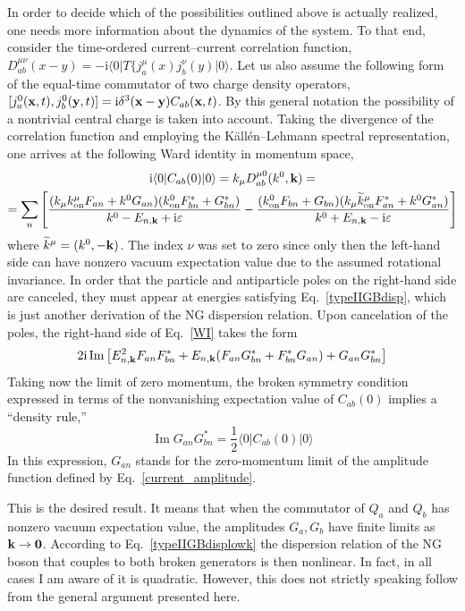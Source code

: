 \documentclass[final,2p,times,12pt,sort&compress]{elsarticle}
\newcommand\vek[1]{{\boldsymbol{\bf #1}}}   %
\newcommand\bra[1]{\langle#1\vert}          %
\newcommand\ket[1]{\vert#1\rangle}          %
\newcommand\imag{\mathrm i}                 %
\newcommand\ve{\varepsilon}
\DeclareMathOperator{\im}{Im}               %
\begin{document}
In order to decide which of the possibilities outlined above is actually
realized, one needs more information about the dynamics of the system. To that
end, consider the time-ordered current--current correlation function,
$D^{\mu\nu}_{ab}(x-y)=-\imag\bra0T\{j^\mu_a(x)j^\nu_b(y)\ket0$. Let us also
assume the following form of the equal-time commutator of two charge density
operators, $[j_a^0(\vek x,t),j_b^0(\vek y,t)]=\imag\delta^3(\vek x-\vek
y)C_{ab}(\vek x,t)$. By this general notation the possibility of a nontrivial
central charge is taken into account. Taking the divergence of the correlation
function and employing the K\"all\'en--Lehmann spectral representation, one
arrives at the following Ward identity in momentum space,
\begin{multline}
\imag\bra0C_{ab}(0)\ket0=k_{\mu}D^{\mu0}_{ab}(k^0,\vek k)=\\
=\sum_n\left[\frac{(k_{\mu}k_{\text{on}}^{\mu}F_{an}+k^0G_{an})
(k_{\text{on}}^0F^*_{bn}+G^*_{bn})}
{k^0-E_{n,\vek k}+\imag\ve}
-\frac{(k_{\text{on}}^0F_{bn}+G_{bn})
(k_{\mu}\widetilde k_{\text{on}}^{\mu}F^*_{an}+k^0G^*_{an})}
{k^0+E_{n,\vek k}-\imag\ve}\right]
\label{WI}
\end{multline}
where $\widetilde k^\mu=(k^0,-\vek k)$. The index $\nu$ was set to zero since
only then the left-hand side can have nonzero vacuum expectation value due to
the assumed rotational invariance. In order that the particle and antiparticle
poles on the right-hand side are canceled, they must appear at energies
satisfying Eq.~\eqref{typeIIGBdisp}, which is just another derivation of the NG
dispersion relation. Upon cancelation of the poles, the right-hand side of
Eq.~\eqref{WI} takes the form
\begin{equation}
2\imag\im\left[E_{n,\vek k}^2F_{an}F^*_{bn}+E_{n,\vek
k}(F_{an}G^*_{bn}+F^*_{bn}G_{an})+G_{an}G^*_{bn}\right]
\end{equation}
Taking now the limit of zero momentum, the broken symmetry condition expressed
in terms of the nonvanishing expectation value of $C_{ab}(0)$ implies a
``density rule,''
\begin{equation}
\im G_{an}G^*_{bn}=\frac12\bra0C_{ab}(0)\ket0
\label{density_rule}
\end{equation}
In this expression, $G_{an}$ stands for the zero-momentum limit of the
amplitude function defined by Eq.~\eqref{current_amplitude}.

This is the desired result. It means that when the commutator of $Q_a$ and $Q_b$
has nonzero vacuum expectation value, the amplitudes $G_a,G_b$ have finite
limits as $\vek k\to\vek0$. According to Eq.~\eqref{typeIIGBdisplowk} the
dispersion relation of the NG boson that couples to both broken generators is
then nonlinear. In fact, in all cases I am aware of it is quadratic. However,
this does not strictly speaking follow from the general argument presented here.
\end{document}
